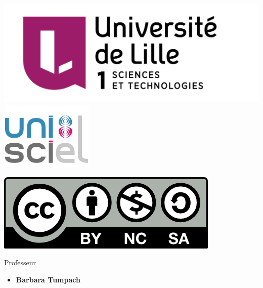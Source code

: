 





\begin{frame}

\thispagestyle{empty}    

  \hspace*{-20ex}
  \begin{minipage}{0.35\textwidth}
  \begin{center}
    \vspace*{5ex}   


    \bigskip


    \includegraphics[scale=0.13]{../divers/Logo-Univ-Lille-1-new.png}
    \quad
    \includegraphics[scale=0.3]{../divers/logo-unisciel.png}

    \vspace*{5ex}

    \includegraphics[scale=0.5]{../divers/by-nc-sa.png}
  \end{center}
  \end{minipage}
  \hfil
  \begin{minipage}{0.90\textwidth}
  \footnotesize
   \vspace*{2ex}
  Professeur
  \begin{itemize}
    \item {\bf Barbara Tumpach}  
  \end{itemize} 
  

\end{minipage}
\end{frame}
